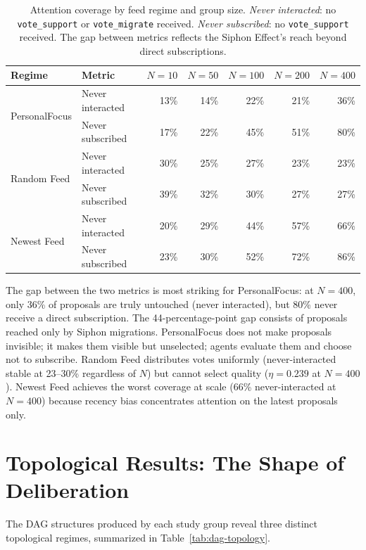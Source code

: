 \documentclass[a4paper, 12pt, twoside]{iviathesis}
\begin{document}
\begin{table}[ht]
\centering
\caption{Attention coverage by feed regime and group size. \textit{Never interacted}: no \texttt{vote\_support} or \texttt{vote\_migrate} received. \textit{Never subscribed}: no \texttt{vote\_support} received. The gap between metrics reflects the Siphon Effect's reach beyond direct subscriptions.}
\label{tab:attention-coverage}
\small
\begin{tabular}{l l r r r r r}
\toprule
\textbf{Regime} & \textbf{Metric} & $N=10$ & $N=50$ & $N=100$ & $N=200$ & $N=400$ \\
\midrule
\multirow{2}{*}{PersonalFocus} & Never interacted & 13\% & 14\% & 22\% & 21\% & 36\% \\
 & Never subscribed & 17\% & 22\% & 45\% & 51\% & 80\% \\
\midrule
\multirow{2}{*}{Random Feed} & Never interacted & 30\% & 25\% & 27\% & 23\% & 23\% \\
 & Never subscribed & 39\% & 32\% & 30\% & 27\% & 27\% \\
\midrule
\multirow{2}{*}{Newest Feed} & Never interacted & 20\% & 29\% & 44\% & 57\% & 66\% \\
 & Never subscribed & 23\% & 30\% & 52\% & 72\% & 86\% \\
\bottomrule
\end{tabular}
\end{table}

The gap between the two metrics is most striking for PersonalFocus: at $N=400$, only 36\% of proposals are truly untouched (never interacted), but 80\% never receive a direct subscription. The 44-percentage-point gap consists of proposals reached only by Siphon migrations. PersonalFocus does not make proposals invisible; it makes them visible but unselected; agents evaluate them and choose not to subscribe. Random Feed distributes votes uniformly (never-interacted stable at 23--30\% regardless of $N$) but cannot select quality ($\eta = 0.239$ at $N=400$). Newest Feed achieves the worst coverage at scale (66\% never-interacted at $N=400$) because recency bias concentrates attention on the latest proposals only.


\section{Topological Results: The Shape of Deliberation} 
\label{sec:topological-results}

The DAG structures produced by each study group reveal three distinct topological regimes, summarized in Table~\ref{tab:dag-topology}.
\end{document}

